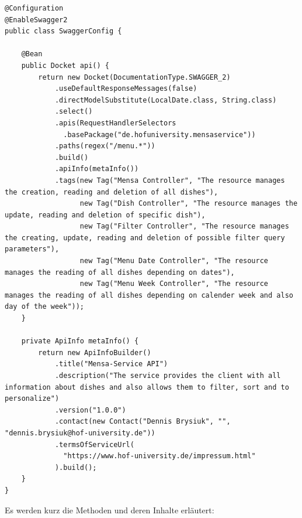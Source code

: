 \newpage
\begin{lstlisting}[caption={Bean zur Swagger Konfiguration im Mensa-Service}]
@Configuration
@EnableSwagger2
public class SwaggerConfig {

    @Bean
    public Docket api() {
        return new Docket(DocumentationType.SWAGGER_2)
            .useDefaultResponseMessages(false)
            .directModelSubstitute(LocalDate.class, String.class)
            .select()
            .apis(RequestHandlerSelectors
              .basePackage("de.hofuniversity.mensaservice"))
            .paths(regex("/menu.*"))
            .build()
            .apiInfo(metaInfo())
            .tags(new Tag("Mensa Controller", "The resource manages the creation, reading and deletion of all dishes"),
                  new Tag("Dish Controller", "The resource manages the update, reading and deletion of specific dish"),
                  new Tag("Filter Controller", "The resource manages the creating, update, reading and deletion of possible filter query parameters"),
                  new Tag("Menu Date Controller", "The resource manages the reading of all dishes depending on dates"),
                  new Tag("Menu Week Controller", "The resource manages the reading of all dishes depending on calender week and also day of the week"));
    }

    private ApiInfo metaInfo() {
        return new ApiInfoBuilder()
            .title("Mensa-Service API")
            .description("The service provides the client with all information about dishes and also allows them to filter, sort and to personalize")
            .version("1.0.0")
            .contact(new Contact("Dennis Brysiuk", "", "dennis.brysiuk@hof-university.de"))
            .termsOfServiceUrl(
              "https://www.hof-university.de/impressum.html"
            ).build();
    }
}
\end{lstlisting}

Es werden kurz die Methoden und deren Inhalte erläutert:

